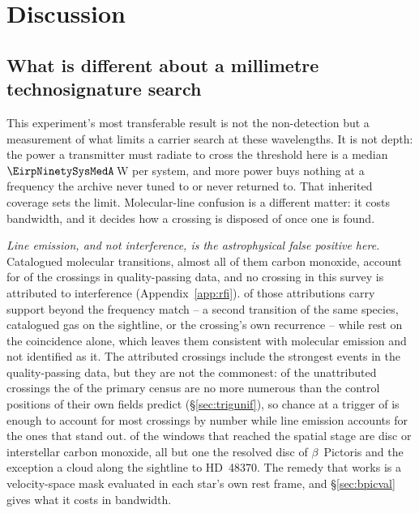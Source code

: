 \section{Discussion}
\label{sec:discussion}

\subsection{What is different about a millimetre technosignature search}
\label{sec:mmdifferent}

This experiment's most transferable result is not the non-detection but
a measurement of what limits a carrier search at these wavelengths. It is not
depth: the power a transmitter must radiate to cross the threshold here is a median
$\EirpNinetySysMedA$\,W per system, and more power buys nothing at a
frequency the archive never tuned to or never returned to. That
inherited coverage sets the limit. Molecular-line confusion is a different
matter: it costs bandwidth, and it decides how a crossing is disposed of once
one is found.

\emph{Line emission, and not interference, is the astrophysical false
positive here.}
Catalogued molecular transitions, almost all of them carbon monoxide, account
for \EvNAttrQp{} of the \EvNCrossQp{} crossings in quality-passing data, and
no crossing in this survey is attributed to interference
(Appendix~\ref{app:rfi}). \LnAttrSupp{} of those attributions carry support
beyond the frequency match -- a second transition of the same species,
catalogued gas on the sightline, or the crossing's own recurrence -- while
\LnAttrCoincWord{} rest on the coincidence alone, which leaves them
consistent with molecular emission and not identified as it. The
attributed crossings include the strongest events in the quality-passing
data, but they are
not the commonest: of the \EvNUnattrQp{} unattributed crossings the \CeObs{}
of the primary census are no more numerous than the control positions of
their own fields predict
(\S\ref{sec:trigunif}), so chance at a trigger of \StageNullTrig{} is enough
to account for most crossings by number while line emission accounts for the
ones that stand out.
\DiscFpWin{} of the \DiscFpOfFlags{} windows that reached the spatial stage
are disc or interstellar carbon monoxide, all but one the resolved disc of
$\beta$~Pictoris and the exception a cloud along the sightline to
HD~48370. The remedy that works is a velocity-space mask evaluated in each star's
own rest frame, and \S\ref{sec:bpicval} gives what it costs in
bandwidth.

